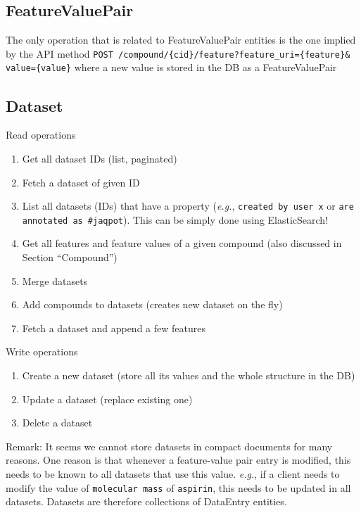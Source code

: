 \subsection{FeatureValuePair}

The only operation that is related to FeatureValuePair entities is the one implied by the API method 
\texttt{POST /compound/\{cid\}/feature?feature\_uri=\{feature\}\& value=\{value\}} where a new value is stored in the DB as a FeatureValuePair

\subsection{Dataset}

\noindent Read operations
\begin{enumerate}
 \item Get all dataset IDs (list, paginated)
\item  Fetch a dataset of given ID
\item  List all datasets (IDs) that have a property (\textit{e.g.}, 
   \texttt{created by user x} or \texttt{are annotated as \#jaqpot}). This can be simply done using ElasticSearch!
\item  Get all features and feature values of a given compound (also discussed in Section “Compound”)
\item  Merge datasets
\item  Add compounds to datasets (creates new dataset on the fly)
\item  Fetch a dataset and append a few features
\end{enumerate}


\noindent Write operations
\begin{enumerate}
\item  Create a new dataset (store all its values and the whole structure in the DB)
\item  Update a dataset (replace existing one)
\item Delete a dataset
\end{enumerate}

\noindent Remark: It seems we cannot store datasets in compact documents for many reasons. 
One reason is that whenever a feature-value pair entry is modified, this needs to be known to 
all datasets that use this value. \textit{e.g.}, if a client needs to modify the value of \texttt{molecular mass}
of \texttt{aspirin}, this needs to be updated in all datasets. 
Datasets are therefore collections of DataEntry entities.




